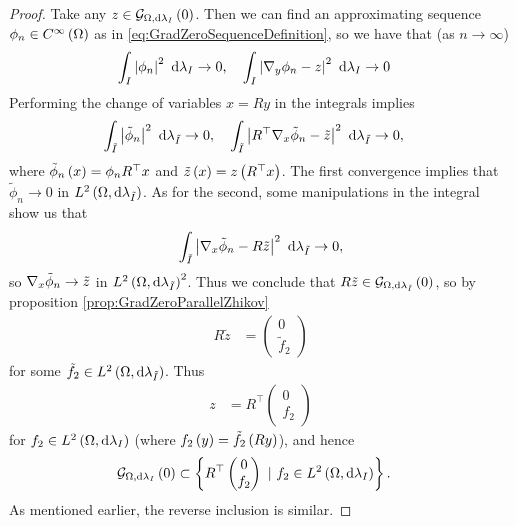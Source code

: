 \begin{proof}
	Take any $z\in\mathcal{G}_{ \Omega, \mathrm{d}\lambda_I}\left( 0 \right)$.
	Then we can find an approximating sequence $\phi_n\in C^{\infty}\left( \Omega \right)$ as in \eqref{eq:GradZeroSequenceDefinition}, so we have that (as $n\rightarrow\infty$)
	\begin{align*}
		\int_{I}\left\lvert \phi_n \right\rvert^2 \ \mathrm{d}\lambda_I \rightarrow 0,
		&\quad \int_{I}\left\lvert \nabla_y\phi_n - z \right\rvert^2 \ \mathrm{d}\lambda_I \rightarrow 0
	\end{align*}
	Performing the change of variables $x=Ry$ in the integrals implies
	\begin{align*}
		\int_{\tilde{I}}\left\lvert \tilde{\phi}_n \right\rvert^2 \ \mathrm{d}\lambda_{\tilde{I}} \rightarrow 0,
		&\quad \int_{\tilde{I}}\left\lvert R^{\top}\nabla_x\tilde{\phi}_n - \tilde{z} \right\rvert^2 \ \mathrm{d}\lambda_{\tilde{I}} \rightarrow 0,
	\end{align*}
	where $\tilde{\phi}_n\left( x \right) = \phi_n{R^{\top}x}$ and $\tilde{z}\left( x \right) = z\left( R^{\top}x \right)$.
	The first convergence implies that $\tilde{\phi}_n\rightarrow 0$ in $L^{2}\left( \Omega,\mathrm{d}\lambda_{\tilde{I}} \right)$.
	As for the second, some manipulations in the integral show us that
	\begin{align*}
		\int_{\tilde{I}}\left\lvert \nabla_x\tilde{\phi}_n - R\tilde{z} \right\rvert^2 \ \mathrm{d}\lambda_{\tilde{I}} \rightarrow 0,
	\end{align*}
	so $\nabla_x\tilde{\phi}_n\rightarrow\tilde{z}$ in $L^{2}\left( \Omega,\mathrm{d}\lambda_{\tilde{I}} \right)^2$.
	Thus we conclude that $R\tilde{z}\in\mathcal{G}_{ \Omega, \mathrm{d}\lambda_{\tilde{I}}}\left( 0 \right)$, so by proposition \ref{prop:GradZeroParallelZhikov}
	\begin{align*}
		R\tilde{z} &= \begin{pmatrix} 0 \\ \tilde{f}_2 \end{pmatrix}
	\end{align*}
	for some $\tilde{f}_2\in L^{2}\left( \Omega,\mathrm{d}\lambda_{\tilde{I}} \right)$.
	Thus
	\begin{align*}
		z &= R^\top \begin{pmatrix} 0 \\ f_2 \end{pmatrix}
	\end{align*}
	for $f_2\in L^{2}\left( \Omega,\mathrm{d}\lambda_I \right)$ (where $f_2\left( y \right) = \tilde{f}_2\left( Ry \right)$), and hence
	\begin{align*}
		\mathcal{G}_{ \Omega, \mathrm{d}\lambda_I}\left( 0 \right) 
		&\subset \left\{  R^{\top} \begin{pmatrix} 0 \\ f_2 \end{pmatrix} \ \vert \ f_2\in L^{2}\left( \Omega,\mathrm{d}\lambda_I \right)  \right\}.
	\end{align*}
	As mentioned earlier, the reverse inclusion is similar.
\end{proof}
